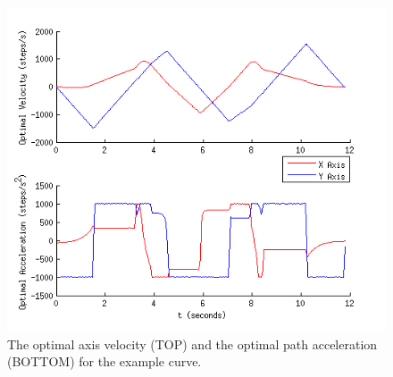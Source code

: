 \begin{figure}[htbp]
\includegraphics[width=\textwidth]{figures/optimisation/bangbang_xy_ddt_dt.png}
\caption[$\dot{\textbf{q}}^*(t)$ and $\ddot{\textbf{q}}^*(t)$]{
The optimal axis velocity (TOP) and the optimal path acceleration (BOTTOM) for the example curve.
\label{fig:bangbang}}
\end{figure}